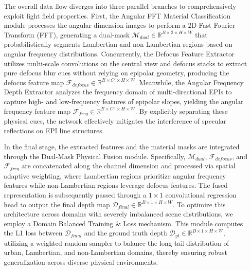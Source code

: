 \documentclass[lettersize,journal]{IEEEtran}
\begin{document}
The overall data flow diverges into three parallel branches to comprehensively exploit light field properties. First, the Angular FFT Material Classification module processes the angular dimension images to perform a 2D Fast Fourier Transform (FFT), generating a dual-mask $\mathcal{M}_{dual} \in \mathbb{R}^{B \times 2 \times H \times W}$ that probabilistically segments Lambertian and non-Lambertian regions based on angular frequency distributions. Concurrently, the Defocus Feature Extractor utilizes multi-scale convolutions on the central view and defocus stacks to extract pure defocus blur cues without relying on epipolar geometry, producing the defocus feature map $\mathcal{F}_{defocus} \in \mathbb{R}^{B \times C' \times H \times W}$. Meanwhile, the Angular Frequency Depth Extractor analyzes the frequency domain of multi-directional EPIs to capture high- and low-frequency features of epipolar slopes, yielding the angular frequency feature map $\mathcal{F}_{freq} \in \mathbb{R}^{B \times C'' \times H \times W}$. By explicitly separating these physical cues, the network effectively mitigates the interference of specular reflections on EPI line structures.

In the final stage, the extracted features and the material masks are integrated through the Dual-Mask Physical Fusion module. Specifically, $\mathcal{M}_{dual}$, $\mathcal{F}_{defocus}$, and $\mathcal{F}_{freq}$ are concatenated along the channel dimension and processed via spatial adaptive weighting, where Lambertian regions prioritize angular frequency features while non-Lambertian regions leverage defocus features. The fused representation is subsequently passed through a $1 \times 1$ convolutional regression head to output the final depth map $\mathcal{D}_{final} \in \mathbb{R}^{B \times 1 \times H \times W}$. To optimize this architecture across domains with severely imbalanced scene distributions, we employ a Domain Balanced Training \& Loss mechanism. This module computes the L1 loss between $\mathcal{D}_{final}$ and the ground truth depth $\mathcal{D}_{gt} \in \mathbb{R}^{B \times 1 \times H \times W}$, utilizing a weighted random sampler to balance the long-tail distribution of urban, Lambertian, and non-Lambertian domains, thereby ensuring robust generalization across diverse physical environments.
\end{document}
